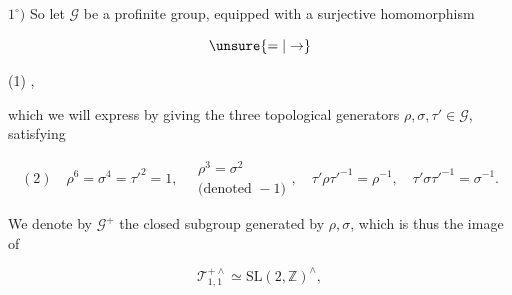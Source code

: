 $1^\circ)$ So let $\mathcal G$ be a profinite group, equipped with a surjective homomorphism

\[\unsure{=|\to}\]

\noindent(1)\quad
{},

which we will express by giving the three topological generators
$\rho,\sigma,\tau'\in\mathcal G$, satisfying

\[
(2)\quad \rho^6=\sigma^4=\tau'^2=1,\quad
\begin{gathered}\rho^3=\sigma^2\\\text{(denoted }-1\text{)}\end{gathered},\quad
\tau'\rho\tau'^{-1}=\rho^{-1},\quad
\tau'\sigma\tau'^{-1}=\sigma^{-1}.
\]

We denote by $\mathcal G^+$ the closed subgroup generated by $\rho,\sigma$,
which is thus the image of

\[
\mathcal T_{1,1}^{+\wedge}\simeq\mathrm{SL}(2,\mathbb Z)^{\wedge},
\]


